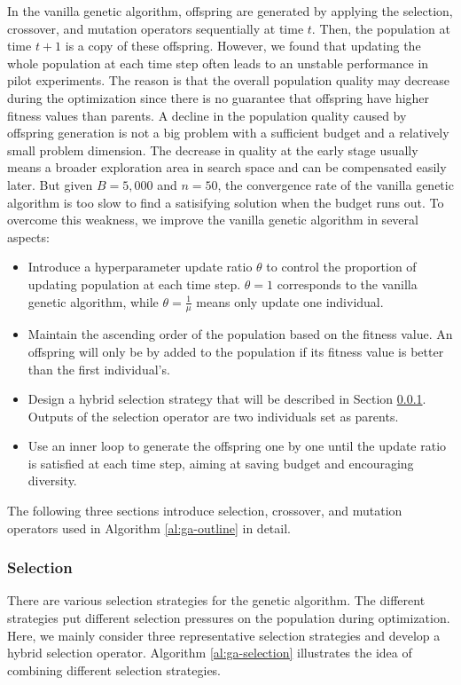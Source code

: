 \documentclass{article}
\begin{document}
In the vanilla genetic algorithm, offspring are generated by applying the selection, crossover, and mutation operators sequentially at time $t$. Then, the population at time $t + 1$ is a copy of these offspring. However, we found that updating the whole population at each time step often leads to an unstable performance in pilot experiments. The reason is that the overall population quality may decrease during the optimization since there is no guarantee that offspring have higher fitness values than parents. A decline in the population quality caused by offspring generation is not a big problem with a sufficient budget and a relatively small problem dimension. The decrease in quality at the early stage usually means a broader exploration area in search space and can be compensated easily later. But given $B = 5,000$ and $n = 50$, the convergence rate of the vanilla genetic algorithm is too slow to find a satisifying solution when the budget runs out. To overcome this weakness, we improve the vanilla genetic algorithm in several aspects:

\begin{itemize}
    \item Introduce a hyperparameter update ratio $\theta$ to control the proportion of updating population at each time step. $\theta = 1$ corresponds to the vanilla genetic algorithm, while $\theta = \frac{1}{\mu}$ means only update one individual.
    \item Maintain the ascending order of the population based on the fitness value. An offspring will only be by added to the population if its fitness value is better than the first individual's.
    \item Design a hybrid selection strategy that will be described in Section \ref{subsubsec:selection}. Outputs of the selection operator are two individuals set as parents.
    \item Use an inner loop to generate the offspring one by one until the update ratio is satisfied at each time step, aiming at saving budget and encouraging diversity.
\end{itemize}

The following three sections introduce selection, crossover, and mutation operators used in Algorithm \ref{al:ga-outline} in detail.

\subsubsection{Selection}\label{subsubsec:selection}
There are various selection strategies for the genetic algorithm. The different strategies put different selection pressures on the population during optimization. Here, we mainly consider three representative selection strategies and develop a hybrid selection operator. Algorithm \ref{al:ga-selection} illustrates the idea of combining different selection strategies.
\end{document}
